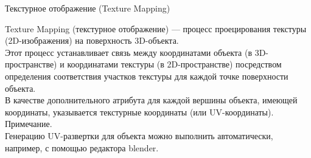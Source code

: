 \documentclass{beamer}
\begin{document}
	\begin{frame}{Текстурное отображение (Texture Mapping)}

		Texture Mapping (текстурное отображение) --- процесс проецирования текстуры (2D-изображения) на поверхность 3D-объекта.  \\
		Этот процесс устанавливает связь между координатами объекта (в 3D-пространстве) и координатами текстуры (в 2D-пространстве) посредством определения соответствия участков текстуры для каждой точке поверхности объекта.\\

		В качестве дополнительного атрибута для каждой вершины объекта, имеющей координаты, указывается текстурные координаты (или UV-координаты).\\
		
		Примечание.\\
		Генерацию UV-развертки для объекта можно выполнить автоматически, например, с помощью редактора blender.\\


	\end{frame}
	
\end{document}
